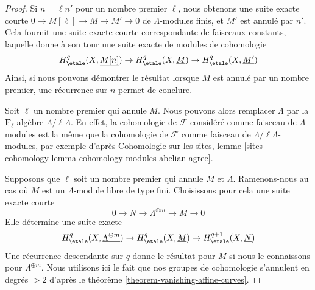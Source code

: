 \begin{proof}
Si $n = \ell n'$ pour un nombre premier $\ell$, nous obtenons une suite
exacte courte $0 \to M[\ell] \to M \to M' \to 0$ de $\Lambda$-modules
finis, et $M'$ est annulé par $n'$.
Cela fournit une suite exacte courte correspondante de faisceaux constants,
laquelle donne à son tour une suite
exacte de modules de cohomologie
$$
H^q_\etale(X, \underline{M[n]}) \to
H^q_\etale(X, \underline{M}) \to
H^q_\etale(X, \underline{M'})
$$
Ainsi, si nous pouvons démontrer le résultat lorsque $M$ est annulé par
un nombre premier, une récurrence sur $n$ permet de conclure.

\medskip\noindent
Soit $\ell$ un nombre premier qui annule $M$.
Nous pouvons alors remplacer $\Lambda$ par la $\mathbf{F}_\ell$-algèbre
$\Lambda/\ell \Lambda$. En effet,
la cohomologie de $\mathcal{F}$ considéré comme faisceau de
$\Lambda$-modules est la même que la cohomologie de $\mathcal{F}$ comme faisceau de
$\Lambda/\ell \Lambda$-modules, par exemple d'après
Cohomologie sur les sites, lemme
\ref{sites-cohomology-lemma-cohomology-modules-abelian-agree}.

\medskip\noindent
Supposons que $\ell$ soit un nombre premier qui annule $M$
et $\Lambda$.
Ramenons-nous au cas où $M$ est un $\Lambda$-module libre de type fini.
Choisissons pour cela une suite exacte courte
$$
0 \to N \to \Lambda^{\oplus m} \to M \to 0
$$
Elle détermine une suite exacte
$$
H^q_\etale(X, \underline{\Lambda^{\oplus m}}) \to
H^q_\etale(X, \underline{M}) \to
H^{q + 1}_\etale(X, \underline{N})
$$
Une récurrence descendante sur $q$ donne le résultat pour $M$
si nous le connaissons pour $\Lambda^{\oplus m}$.
Nous utilisons ici le fait que nos groupes de cohomologie
s'annulent en degrés $> 2$
d'après le théorème \ref{theorem-vanishing-affine-curves}.


\end{proof}

